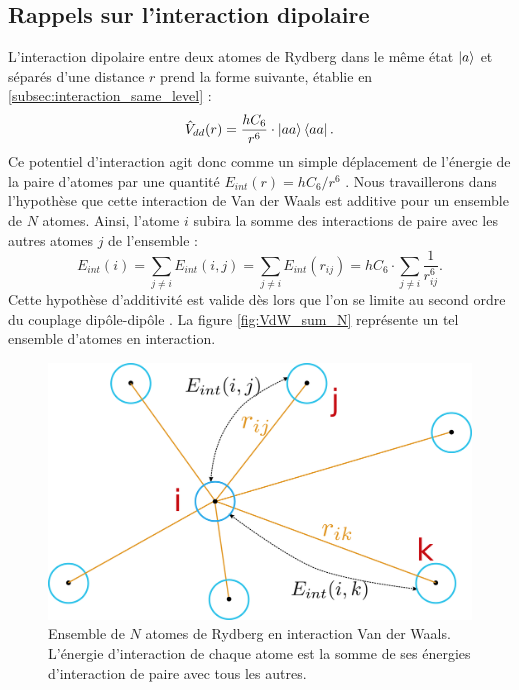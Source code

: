 	\subsection{Rappels sur l'interaction dipolaire}
\noindent L'interaction dipolaire entre deux atomes de Rydberg dans le même état $\ket{a}$ et séparés d'une distance $r$ prend la forme suivante, établie en \ref{subsec:interaction_same_level} :
\begin{equation}
\label{eq:Vdd_aa}
\hat{V}_{dd}(r) = \frac{hC_6}{r^6} \cdot \ket{aa}\bra{aa}.
\end{equation}
Ce potentiel d'interaction agit donc comme un simple déplacement de l'énergie de la paire d'atomes par une quantité $E_{int} (r)=hC_6/r^6$ .
Nous travaillerons dans l'hypothèse que cette interaction de Van der Waals est additive pour un ensemble de $N$ atomes.
Ainsi, l'atome $i$ subira la somme des interactions de paire avec les autres atomes $j$ de l'ensemble :
\begin{equation}
\label{eq:Eint_isum}
E_{int}(i) = \sum_{j\neq i} E_{int}(i,j) = \sum_{j\neq i} E_{int}(r_{ij}) = h C_6 \cdot \sum_{j \neq i} \frac{1}{r_{ij}^6}.
\end{equation}
Cette hypothèse d'additivité est valide dès lors que l'on se limite au second ordre du couplage dipôle-dipôle \cite{ENS_CHIPINTERACTION15,MX_TELLER_ADDITIVEVDW}.
La figure \eqref{fig:VdW_sum_N} représente un tel ensemble d'atomes en interaction.
%
\begin{figure}[h]
\centering
\includegraphics[width=0.6\linewidth]{figures/low_l/Natomes}
\caption[Ensemble de $N$ atomes de Rydberg en interaction Van der Waals]
{Ensemble de $N$ atomes de Rydberg en interaction Van der Waals.
L'énergie d'interaction de chaque atome est la somme de ses énergies d'interaction de paire avec tous les autres.
}
\label{fig:VdW_sum_N}
\end{figure}

